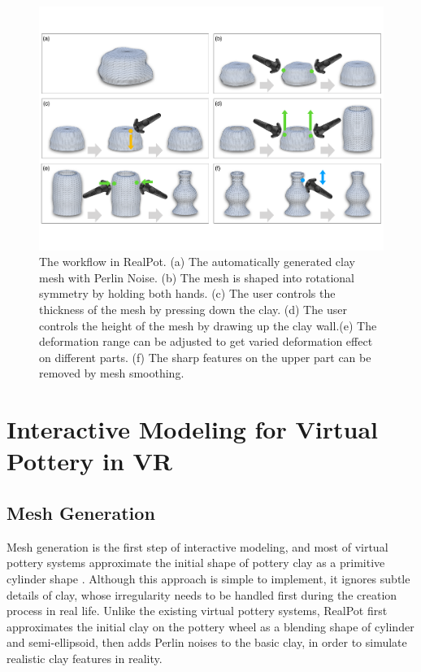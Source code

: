 \documentclass{svjour3}                     %
\begin{document}
\begin{figure}
\includegraphics[width=\textwidth]{fig3}
\caption{The workflow in RealPot. (a) The automatically generated clay mesh with Perlin Noise. (b) The mesh is shaped into rotational symmetry by holding both hands. (c) The user controls the thickness of the mesh by pressing down the clay. (d) The user controls the height of the mesh by drawing up the clay wall.(e) The deformation range can be adjusted to get varied deformation effect on different parts. (f) The sharp features on the upper part can be removed by mesh smoothing.}
\label{fig:workflow}
\end{figure}

\section{Interactive Modeling for Virtual Pottery in VR}
\label{sec:4}

\subsection{Mesh Generation}
\label{sec:4.1}

Mesh generation is the first step of interactive modeling, and most of virtual pottery systems approximate the initial shape of pottery clay as a primitive cylinder shape \cite{han2007ar,ramani2015gesture,ramani2016extracting}.
Although this approach is simple to implement, it ignores subtle details of clay, whose irregularity needs to be handled first during the creation process in real life.
Unlike the existing virtual pottery systems, RealPot first approximates the initial clay on the pottery wheel as a blending shape of cylinder and semi-ellipsoid, then adds Perlin noises to the basic clay, in order to simulate realistic clay features in reality.
\end{document}
